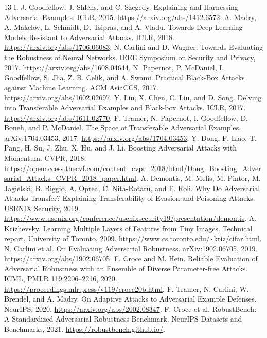 \documentclass[10pt,twocolumn]{article}
\begin{document}
\begin{thebibliography}{13}
 I. J. Goodfellow, J. Shlens, and C. Szegedy. Explaining and Harnessing Adversarial Examples. ICLR, 2015. \url{https://arxiv.org/abs/1412.6572}.
 A. Madry, A. Makelov, L. Schmidt, D. Tsipras, and A. Vladu. Towards Deep Learning Models Resistant to Adversarial Attacks. ICLR, 2018. \url{https://arxiv.org/abs/1706.06083}.
 N. Carlini and D. Wagner. Towards Evaluating the Robustness of Neural Networks. IEEE Symposium on Security and Privacy, 2017. \url{https://arxiv.org/abs/1608.04644}.
 N. Papernot, P. McDaniel, I. Goodfellow, S. Jha, Z. B. Celik, and A. Swami. Practical Black-Box Attacks against Machine Learning. ACM AsiaCCS, 2017. \url{https://arxiv.org/abs/1602.02697}.
 Y. Liu, X. Chen, C. Liu, and D. Song. Delving into Transferable Adversarial Examples and Black-box Attacks. ICLR, 2017. \url{https://arxiv.org/abs/1611.02770}.
 F. Tramer, N. Papernot, I. Goodfellow, D. Boneh, and P. McDaniel. The Space of Transferable Adversarial Examples. arXiv:1704.03453, 2017. \url{https://arxiv.org/abs/1704.03453}.
 Y. Dong, F. Liao, T. Pang, H. Su, J. Zhu, X. Hu, and J. Li. Boosting Adversarial Attacks with Momentum. CVPR, 2018. \url{https://openaccess.thecvf.com/content_cvpr_2018/html/Dong_Boosting_Adversarial_Attacks_CVPR_2018_paper.html}.
 A. Demontis, M. Melis, M. Pintor, M. Jagielski, B. Biggio, A. Oprea, C. Nita-Rotaru, and F. Roli. Why Do Adversarial Attacks Transfer? Explaining Transferability of Evasion and Poisoning Attacks. USENIX Security, 2019. \url{https://www.usenix.org/conference/usenixsecurity19/presentation/demontis}.
\newpage
{} A. Krizhevsky. Learning Multiple Layers of Features from Tiny Images. Technical report, University of Toronto, 2009. \url{https://www.cs.toronto.edu/~kriz/cifar.html}.
 N. Carlini et al. On Evaluating Adversarial Robustness. arXiv:1902.06705, 2019. \url{https://arxiv.org/abs/1902.06705}.
 F. Croce and M. Hein. Reliable Evaluation of Adversarial Robustness with an Ensemble of Diverse Parameter-free Attacks. ICML, PMLR 119:2206--2216, 2020. \url{https://proceedings.mlr.press/v119/croce20b.html}.
 F. Tramer, N. Carlini, W. Brendel, and A. Madry. On Adaptive Attacks to Adversarial Example Defenses. NeurIPS, 2020. \url{https://arxiv.org/abs/2002.08347}.
 F. Croce et al. RobustBench: A Standardized Adversarial Robustness Benchmark. NeurIPS Datasets and Benchmarks, 2021. \url{https://robustbench.github.io/}.
\end{thebibliography}
\end{document}
